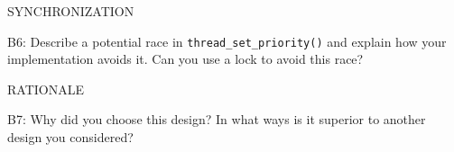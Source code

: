 \begin{aspect}{SYNCHRONIZATION}

	\begin{qc}
		B6: Describe a potential race in \lstinline{thread_set_priority()} and explain how your implementation avoids it.  Can you use a lock to avoid this race?
	\end{qc}

\end{aspect}

\begin{aspect}{RATIONALE}
	\begin{qc}
		B7: Why did you choose this design?  In what ways is it superior to another design you considered?
	\end{qc}

\end{aspect}
